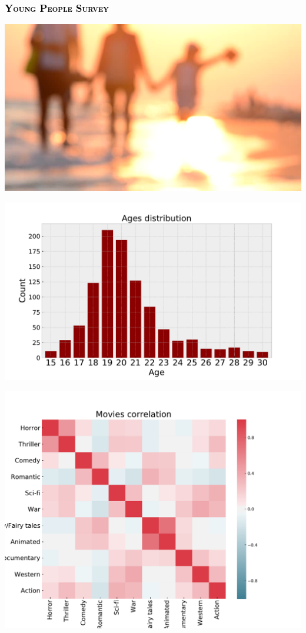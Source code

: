 \documentclass[russian, 10pt]{beamer}
\begin{document}
\begin{frame}
\frametitle{\textsc{\textcolor{black}{Young People Survey}}}

\centering
\includegraphics[scale=0.45]{images/intro.jpg}

\end{frame}


\begin{frame}

\centering
\includegraphics[scale=0.45]{images/1.pdf}

\end{frame}

\begin{frame}

\centering
\includegraphics[scale=0.45]{images/2.pdf}

\end{frame}
\end{document}
